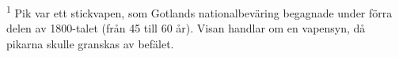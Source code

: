 \textsuperscript{1} Pik var ett stickvapen, som Gotlands nationalbeväring
begagnade under förra delen av 1800-talet (från 45 till 60 år).
Visan handlar om en vapensyn, då pikarna skulle granskas av befälet.